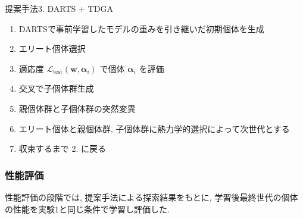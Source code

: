 \begin{algorithm}[tb]
  \caption{提案手法3. DARTS + TDGA}
  \label{alg3}
  \begin{enumerate}
    \item DARTSで事前学習したモデルの重みを引き継いだ初期個体を生成
    \item エリート個体選択
    \item 適応度 $\displaystyle \mathcal{L}_{\mathrm{test}}(\bm{w}, \bm{\alpha}_i)$ で個体 $\bm{\alpha}_i$ を評価
    \item 交叉で子個体群生成
    \item 親個体群と子個体群の突然変異
    \item エリート個体と親個体群, 子個体群に熱力学的選択によって次世代とする
    \item 収束するまで 2. に戻る
  \end{enumerate}
\end{algorithm}




\subsubsection{性能評価}

性能評価の段階では, 提案手法による探索結果をもとに,
学習後最終世代の個体の性能を実験1と同じ条件で学習し評価した.
